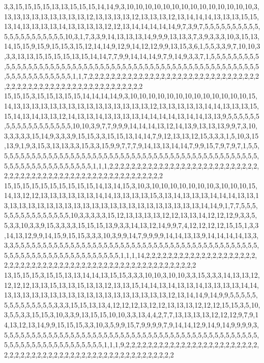 3,3,15,15,15,15,13,13,15,15,15,14,14,9,3,10,10,10,10,10,10,10,10,10,10,10,10,10,10,3,13,13,13,13,13,13,13,13,13,12,13,13,13,13,12,13,13,13,12,13,14,14,14,13,13,13,15,15,13,14,13,13,13,13,14,13,13,13,13,12,12,13,14,14,14,14,14,9,7,3,9,7,5,5,5,5,5,5,5,5,5,5,5,5,5,5,5,5,5,5,5,5,5,10,3,1,7,3,3,9,14,13,13,13,14,9,9,9,13,13,3,7,3,9,3,3,3,10,3,15,13,14,15,15,9,15,9,15,15,3,15,12,14,14,9,12,9,14,12,12,9,9,13,15,3,6,1,5,5,3,3,9,7,10,10,3,3,3,13,13,15,15,15,15,13,15,14,14,7,7,9,9,14,14,14,9,7,9,14,9,3,3,7,1,5,5,5,5,5,5,5,5,5,5,5,5,5,5,5,5,5,5,5,5,5,5,5,5,5,5,5,5,5,5,5,5,5,5,5,5,5,5,5,5,5,5,5,5,5,5,5,5,5,5,5,5,5,5,5,5,5,5,5,5,5,5,5,5,5,5,5,1,1,7,2,2,2,2,2,2,2,2,2,2,2,2,2,2,2,2,2,2,2,2,2,2,2,2,2,2,2,2,2,2,2,2,2,2,2,2,2,2,2,2,2,2,2,2,2,2,2,2,2,2,2,2,2,2,2,2
15,15,15,3,15,15,13,15,15,14,14,14,14,9,3,10,10,10,10,10,10,10,10,10,10,10,10,10,15,14,13,13,13,13,13,13,13,13,13,13,13,13,13,13,13,12,13,13,13,13,13,14,14,13,13,13,15,15,14,13,14,13,13,12,14,13,13,14,13,13,13,13,14,14,14,14,13,14,14,13,13,9,5,5,5,5,5,5,5,5,5,5,5,5,5,5,5,5,5,5,10,10,3,9,7,7,9,9,9,14,14,14,13,12,14,13,9,13,13,13,9,9,7,3,10,3,3,3,3,3,15,14,9,3,3,3,9,15,15,3,3,15,15,13,14,14,7,9,12,13,13,12,15,3,3,3,1,5,10,3,15,13,9,1,9,3,15,3,13,13,3,3,15,3,3,15,9,9,7,7,7,9,14,13,13,14,14,7,9,9,15,7,9,7,9,7,1,5,5,5,5,5,5,5,5,5,5,5,5,5,5,5,5,5,5,5,5,5,5,5,5,5,5,5,5,5,5,5,5,5,5,5,5,5,5,5,5,5,5,5,5,5,5,5,5,5,5,5,5,5,5,5,5,5,5,5,5,5,5,5,5,1,1,1,2,2,2,2,2,2,2,2,2,2,2,2,2,2,2,2,2,2,2,2,2,2,2,2,2,2,2,2,2,2,2,2,2,2,2,2,2,2,2,2,2,2,2,2,2,2,2,2,2,2,2,2,2,2,2,2
15,15,15,15,15,15,15,15,15,15,14,13,14,15,3,10,3,10,10,10,10,10,10,10,3,10,10,10,15,14,13,12,12,13,13,13,13,13,13,14,14,13,13,13,13,15,3,13,14,13,13,13,14,14,14,13,13,13,13,13,13,13,13,13,13,13,13,13,13,13,13,13,13,13,13,13,13,13,13,14,14,9,1,7,7,5,5,5,5,5,5,5,5,5,5,5,5,5,5,5,10,3,3,3,3,3,15,12,13,13,13,13,12,12,13,13,14,12,12,12,9,3,3,5,5,3,3,10,3,3,9,15,3,3,3,3,15,15,15,13,9,3,3,14,13,12,14,9,9,7,4,12,12,12,12,15,15,1,3,3,14,13,12,9,9,14,15,9,15,15,3,3,3,10,3,9,9,14,7,9,9,9,9,14,14,13,13,9,14,14,14,14,13,3,3,3,5,5,5,5,5,5,5,5,5,5,5,5,5,5,5,5,5,5,5,5,5,5,5,5,5,5,5,5,5,5,5,5,5,5,5,5,5,5,5,5,5,5,5,5,5,5,5,5,5,5,5,5,5,5,5,5,5,5,5,5,5,5,5,5,5,1,1,1,14,2,2,2,2,2,2,2,2,2,2,2,2,2,2,2,2,2,2,2,2,2,2,2,2,2,2,2,2,2,2,2,2,2,2,2,2,2,2,2,2,2,2,2,2,2,2,2,2,2,2,2,2,2,2,2
13,15,15,15,3,15,15,13,13,14,14,13,15,15,3,3,3,10,10,3,10,10,3,3,15,3,3,3,14,13,13,12,12,12,12,13,13,15,13,13,15,13,13,12,13,13,15,14,14,13,14,13,13,14,13,13,13,13,14,14,13,13,13,13,13,13,13,13,13,13,13,13,13,13,13,13,13,13,12,13,14,14,9,14,9,9,5,5,5,5,5,5,5,5,5,5,5,5,5,5,3,3,3,15,15,13,13,4,12,12,12,13,12,12,13,13,13,12,12,12,15,15,3,5,10,3,5,5,3,3,15,15,3,10,3,3,9,13,15,15,10,10,3,3,13,4,4,2,7,7,13,13,13,13,12,12,12,9,7,9,14,13,12,13,14,9,9,15,15,15,3,3,10,3,5,9,9,15,7,9,9,9,9,7,9,14,14,12,9,14,9,14,9,9,9,9,3,5,5,5,5,5,5,5,5,5,5,5,5,5,5,5,5,5,5,5,5,5,5,5,5,5,5,5,5,5,5,5,5,5,5,5,5,5,5,5,5,5,5,5,5,5,5,5,5,5,5,5,5,5,5,5,5,5,5,5,5,5,5,5,5,1,1,1,9,2,2,2,2,2,2,2,2,2,2,2,2,2,2,2,2,2,2,2,2,2,2,2,2,2,2,2,2,2,2,2,2,2,2,2,2,2,2,2,2,2,2,2,2,2,2,2,2,2,2,2,2,2,2,2
